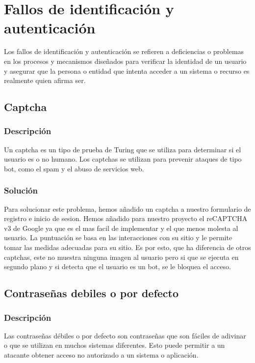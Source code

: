 \documentclass{report}
\begin{document}
        \section{Fallos de identificación y autenticación}
            Los fallos de identificación y autenticación se refieren a deficiencias o problemas en los procesos y mecanismos diseñados para verificar la identidad de un usuario y asegurar que la persona o entidad que intenta acceder a un sistema o recurso es realmente quien afirma ser. 
            \subsection{Captcha}
                \subsubsection{Descripción}
                    Un captcha es un tipo de prueba de Turing que se utiliza para determinar si el usuario es o no humano. Los captchas se utilizan para prevenir ataques de tipo bot, como el spam y el abuso de servicios web.
                \subsubsection{Solución}
                    Para solucionar este problema, hemos añadido un captcha a nuestro formulario de registro e inicio de sesion.
                    Hemos añadido para nuestro proyecto el reCAPTCHA v3 de Google ya que es el mas facil de implementar y el que menos molesta al usuario.
                    La puntuación se basa en las interacciones con su sitio y le permite tomar las medidas adecuadas para su sitio.
                    Es por esto, que ha diferencia de otros captchas, este no muestra ninguna imagen al usuario pero si que se ejecuta en segundo plano y si detecta que el usuario es un bot, se le bloquea el acceso.
            \clearpage
            \subsection{Contraseñas debiles o por defecto}
                \subsubsection{Descripción}
                    Las contraseñas débiles o por defecto son contraseñas que son fáciles de adivinar o que se utilizan en muchos sistemas diferentes. Esto puede permitir a un atacante obtener acceso no autorizado a un sistema o aplicación.
\end{document}
